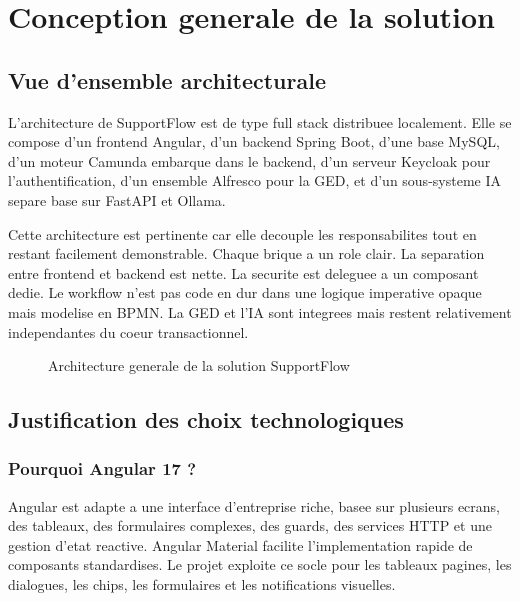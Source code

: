 ﻿\chapter{Conception generale de la solution}

\section{Vue d'ensemble architecturale}

L'architecture de SupportFlow est de type full stack distribuee localement. Elle se compose d'un frontend Angular, d'un backend Spring Boot, d'une base MySQL, d'un moteur Camunda embarque dans le backend, d'un serveur Keycloak pour l'authentification, d'un ensemble Alfresco pour la GED, et d'un sous-systeme IA separe base sur FastAPI et Ollama.

Cette architecture est pertinente car elle decouple les responsabilites tout en restant facilement demonstrable. Chaque brique a un role clair. La separation entre frontend et backend est nette. La securite est deleguee a un composant dedie. Le workflow n'est pas code en dur dans une logique imperative opaque mais modelise en BPMN. La GED et l'IA sont integrees mais restent relativement independantes du coeur transactionnel.

\begin{figure}[htbp]
  \centering
  \caption{Architecture generale de la solution SupportFlow}
\end{figure}

\section{Justification des choix technologiques}

\subsection{Pourquoi Angular 17 ?}

Angular est adapte a une interface d'entreprise riche, basee sur plusieurs ecrans, des tableaux, des formulaires complexes, des guards, des services HTTP et une gestion d'etat reactive. Angular Material facilite l'implementation rapide de composants standardises. Le projet exploite ce socle pour les tableaux pagines, les dialogues, les chips, les formulaires et les notifications visuelles.

